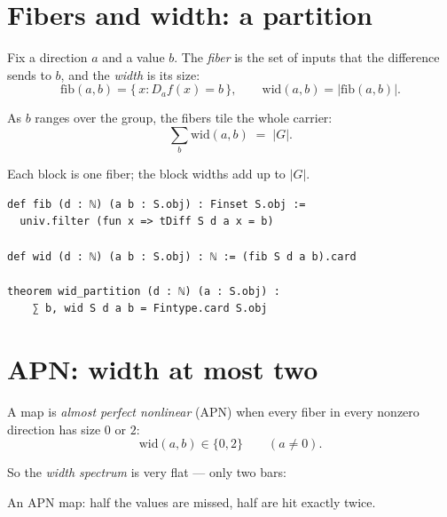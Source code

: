 \documentclass[11pt]{article}
\begin{document}
\section{Fibers and width: a partition}

Fix a direction $a$ and a value $b$.  The \emph{fiber} is the set of inputs that
the difference sends to $b$, and the \emph{width} is its size:
\[
  \mathrm{fib}(a,b) = \{\, x : D_a f(x) = b \,\},
  \qquad
  \mathrm{wid}(a,b) = \bigl|\mathrm{fib}(a,b)\bigr| .
\]

As $b$ ranges over the group, the fibers tile the whole carrier:
\[
  \sum_b \mathrm{wid}(a,b) \;=\; |G| .
\]

\begin{center}

{\small Each block is one fiber; the block widths add up to $|G|$.}
\end{center}

\begin{lstlisting}
def fib (d : ℕ) (a b : S.obj) : Finset S.obj :=
  univ.filter (fun x => tDiff S d a x = b)

def wid (d : ℕ) (a b : S.obj) : ℕ := (fib S d a b).card

theorem wid_partition (d : ℕ) (a : S.obj) :
    ∑ b, wid S d a b = Fintype.card S.obj
\end{lstlisting}

\section{APN: width at most two}

A map is \emph{almost perfect nonlinear} (APN) when every fiber in every nonzero
direction has size $0$ or $2$:
\[
  \mathrm{wid}(a,b) \in \{0,2\} \qquad (a\neq 0).
\]

So the \emph{width spectrum} is very flat --- only two bars:

\begin{center}

{\small An APN map: half the values are missed, half are hit exactly twice.}
\end{center}
\end{document}

